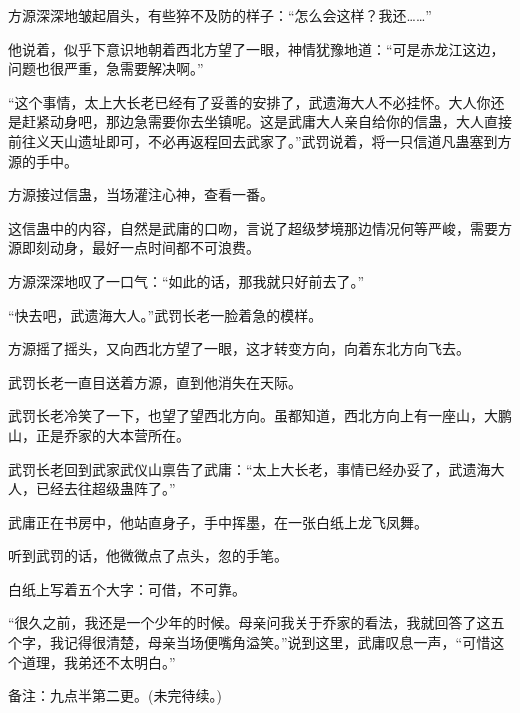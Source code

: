 \begin{this_body}
方源深深地皱起眉头，有些猝不及防的样子：“怎么会这样？我还……”

他说着，似乎下意识地朝着西北方望了一眼，神情犹豫地道：“可是赤龙江这边，问题也很严重，急需要解决啊。”

“这个事情，太上大长老已经有了妥善的安排了，武遗海大人不必挂怀。大人你还是赶紧动身吧，那边急需要你去坐镇呢。这是武庸大人亲自给你的信蛊，大人直接前往义天山遗址即可，不必再返程回去武家了。”武罚说着，将一只信道凡蛊塞到方源的手中。

方源接过信蛊，当场灌注心神，查看一番。

这信蛊中的内容，自然是武庸的口吻，言说了超级梦境那边情况何等严峻，需要方源即刻动身，最好一点时间都不可浪费。

方源深深地叹了一口气：“如此的话，那我就只好前去了。”

“快去吧，武遗海大人。”武罚长老一脸着急的模样。

方源摇了摇头，又向西北方望了一眼，这才转变方向，向着东北方向飞去。

武罚长老一直目送着方源，直到他消失在天际。

武罚长老冷笑了一下，也望了望西北方向。虽都知道，西北方向上有一座山，大鹏山，正是乔家的大本营所在。

武罚长老回到武家武仪山禀告了武庸：“太上大长老，事情已经办妥了，武遗海大人，已经去往超级蛊阵了。”

武庸正在书房中，他站直身子，手中挥墨，在一张白纸上龙飞凤舞。

听到武罚的话，他微微点了点头，忽的手笔。

白纸上写着五个大字：可借，不可靠。

“很久之前，我还是一个少年的时候。母亲问我关于乔家的看法，我就回答了这五个字，我记得很清楚，母亲当场便嘴角溢笑。”说到这里，武庸叹息一声，“可惜这个道理，我弟还不太明白。”

备注：九点半第二更。(未完待续。)

\end{this_body}

